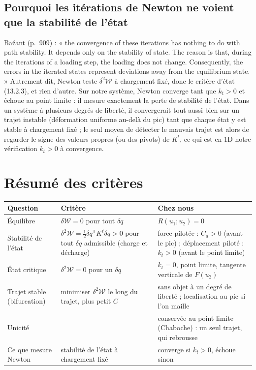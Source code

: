 \documentclass[11pt,a4paper]{article}
\newcommand{\dW}{\delta^2\mathcal W}
\begin{document}
\subsection{Pourquoi les itérations de Newton ne voient que la stabilité de l'état}
Bažant (p.~909) : « the convergence of these iterations has nothing to do with path stability.
It depends only on the stability of state. The reason is that, during the iterations of a
loading step, the loading does not change. Consequently, the errors in the iterated states
represent deviations away from the equilibrium state. » Autrement dit, Newton teste $\dW$ à
chargement fixé, donc le critère d'état (13.2.3), et rien d'autre. Sur notre système, Newton
converge tant que $k_t > 0$ et échoue au point limite : il mesure exactement la perte de
stabilité de l'état. Dans un système à plusieurs degrés de liberté, il convergerait tout aussi
bien sur un trajet instable (déformation uniforme au-delà du pic) tant que chaque état y est
stable à chargement fixé ; le seul moyen de détecter le mauvais trajet est alors de regarder
le signe des valeurs propres (ou des pivots) de $K^t$, ce qui est en 1D notre vérification
$k_t > 0$ à convergence.

\section{Résumé des critères}
\begin{center}
\begin{tabular}{@{}p{3.3cm}p{5.0cm}p{5.6cm}@{}}
\toprule
Question & Critère & Chez nous\\
\midrule
Équilibre & $\delta\mathcal W = 0$ pour tout $\delta q$ & $R(u_1;u_2) = 0$\\
Stabilité de l'état & $\dW = \tfrac12\delta q^{\mathsf T}K^t\delta q > 0$ pour tout $\delta q$ admissible (charge et décharge) & force pilotée : $C_a > 0$ (avant le pic) ; déplacement piloté : $k_t > 0$ (avant le point limite)\\
État critique & $\dW = 0$ pour un $\delta q$ & $k_t = 0$, point limite, tangente verticale de $F(u_2)$\\
Trajet stable (bifurcation) & minimiser $\dW$ le long du trajet, plus petit $C$ & sans objet à un degré de liberté ; localisation au pic si l'on maille\\
Unicité & & conservée au point limite (Chaboche) : un seul trajet, qui rebrousse\\
Ce que mesure Newton & stabilité de l'état à chargement fixé & converge si $k_t > 0$, échoue sinon\\
\bottomrule
\end{tabular}
\end{center}
\end{document}

